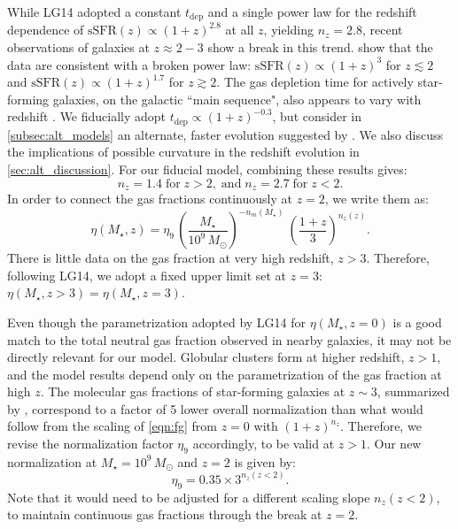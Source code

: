 \documentclass[fleqn,usenatbib]{mnras}
\newcommand{\Msun}{\,M_{\odot}}
\newcommand{\tdep}{t_{\mathrm{dep}}}
\newcommand{\Mstar}{M_{\star}}
\newcommand{\sSFR}{\mathrm{sSFR}}
\begin{document}
While LG14 adopted a constant $\tdep$ and a single power law for the redshift dependence of $\sSFR(z) \propto (1+z)^{2.8}$ at all $z$, yielding $n_z = 2.8$, recent observations of galaxies at $z \approx 2-3$ show a break in this trend. \citet{lilly_etal_2013} show that the data are consistent with a broken power law: $\sSFR(z) \propto (1+z)^3$ for $z \lesssim 2$ and $\sSFR(z) \propto (1+z)^{1.7}$ for $z \gtrsim 2$.  The gas depletion time for actively star-forming galaxies, on the galactic ``main sequence", also appears to vary with redshift \citep{genzel_etal_2015}. We fiducially adopt $\tdep \propto {(1+z)^{-0.3}}$, but consider in \autoref{subsec:alt_models} an alternate, faster evolution suggested by \citet{tacconi_etal_2017}. We also discuss the implications of possible curvature in the redshift evolution in \autoref{sec:alt_discussion}. For our fiducial model, combining these results gives:
\begin{equation}
  n_z = 1.4 \;\mathrm{for}\; z > 2, \;\mathrm{and}\; n_z = 2.7 \;\mathrm{for}\; z < 2. 
  \nonumber
\end{equation}
In order to connect the gas fractions continuously at $z=2$, we write them as: 
\begin{equation}
  \eta(\Mstar,z) = \eta_9 \, \left(\frac{\Mstar}{10^9\Msun}\right)^{-n_m(\Mstar)} \ \left(\frac{1+z}{3}\right)^{n_z(z)}.
  \label{eqn:fg}
\end{equation}
There is little data on the gas fraction at very high redshift, $z > 3$. Therefore, following LG14, we adopt a fixed upper limit set at $z=3$: $\eta(\Mstar,z>3) = \eta(\Mstar,z=3)$.

Even though the parametrization adopted by LG14 for $\eta(\Mstar,z=0)$ is a good match to the total neutral gas fraction observed in nearby galaxies, it may not be directly relevant for our model. Globular clusters form at higher redshift, $z > 1$, and the model results depend only on the parametrization of the gas fraction at high $z$. The molecular gas fractions of star-forming galaxies at $z \sim 3$, summarized by \citet{tacconi_etal_2017}, correspond to a factor of 5 lower overall normalization than what would follow from the scaling of \autoref{eqn:fg} from $z=0$ with $(1+z)^{n_z}$. Therefore, we revise the normalization factor $\eta_{9}$ accordingly, to be valid at $z > 1$. Our new normalization at $\Mstar = 10^9\Msun$ and $z=2$ is given by: 
\begin{equation}
  \eta_{9} = 0.35\times 3^{n_z(z<2)}.
\end{equation}
Note that it would need to be adjusted for a different scaling slope $n_z(z<2)$, to maintain continuous gas fractions through the break at $z=2$.
\end{document}
